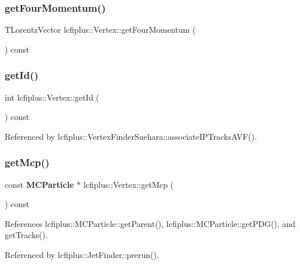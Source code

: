 \subsubsection{get\+Four\+Momentum()}
{\footnotesize\ttfamily T\+Lorentz\+Vector lcfiplus\+::\+Vertex\+::get\+Four\+Momentum (\begin{DoxyParamCaption}{ }\end{DoxyParamCaption}) const}

\mbox{\label{classlcfiplus_1_1Vertex_a8ae543477020ca38de8b82a3a8623214}} 
\subsubsection{get\+Id()}
{\footnotesize\ttfamily int lcfiplus\+::\+Vertex\+::get\+Id (\begin{DoxyParamCaption}{ }\end{DoxyParamCaption}) const\hspace{0.3cm}{\ttfamily [inline]}}



Referenced by lcfiplus\+::\+Vertex\+Finder\+Suehara\+::associate\+I\+P\+Tracks\+A\+V\+F().

\mbox{\label{classlcfiplus_1_1Vertex_a7d68bd3f11bfa77a576648ecce9e0ffa}} 
\subsubsection{get\+Mcp()}
{\footnotesize\ttfamily const \textbf{ M\+C\+Particle} $\ast$ lcfiplus\+::\+Vertex\+::get\+Mcp (\begin{DoxyParamCaption}{ }\end{DoxyParamCaption}) const}



References lcfiplus\+::\+M\+C\+Particle\+::get\+Parent(), lcfiplus\+::\+M\+C\+Particle\+::get\+P\+D\+G(), and get\+Tracks().



Referenced by lcfiplus\+::\+Jet\+Finder\+::prerun().

\mbox{\label{classlcfiplus_1_1Vertex_ad3ffa7757b57558d60faef925a5a8bbc}} 
